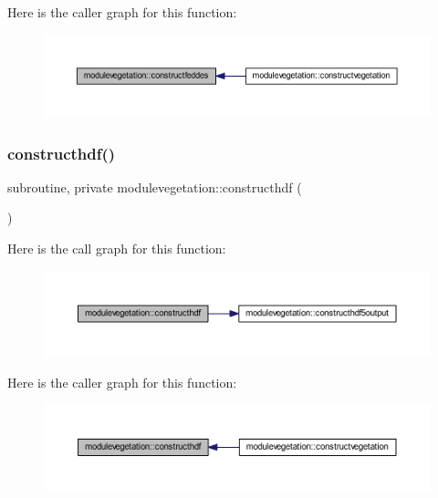 Here is the caller graph for this function\+:\nopagebreak
\begin{figure}[H]
\begin{center}
\leavevmode
\includegraphics[width=350pt]{namespacemodulevegetation_a74fe469b99fa1d5d3f2ef2182dd59c7b_icgraph}
\end{center}
\end{figure}
\mbox{\label{namespacemodulevegetation_a12974a55f8580bce1b17db7e139d7955}} 
\subsubsection{\texorpdfstring{constructhdf()}{constructhdf()}}
{\footnotesize\ttfamily subroutine, private modulevegetation\+::constructhdf (\begin{DoxyParamCaption}{ }\end{DoxyParamCaption})\hspace{0.3cm}{\ttfamily [private]}}

Here is the call graph for this function\+:\nopagebreak
\begin{figure}[H]
\begin{center}
\leavevmode
\includegraphics[width=350pt]{namespacemodulevegetation_a12974a55f8580bce1b17db7e139d7955_cgraph}
\end{center}
\end{figure}
Here is the caller graph for this function\+:\nopagebreak
\begin{figure}[H]
\begin{center}
\leavevmode
\includegraphics[width=350pt]{namespacemodulevegetation_a12974a55f8580bce1b17db7e139d7955_icgraph}
\end{center}
\end{figure}
\mbox{\label{namespacemodulevegetation_a687f37b7582103fd8a3308f5602b635f}} 
